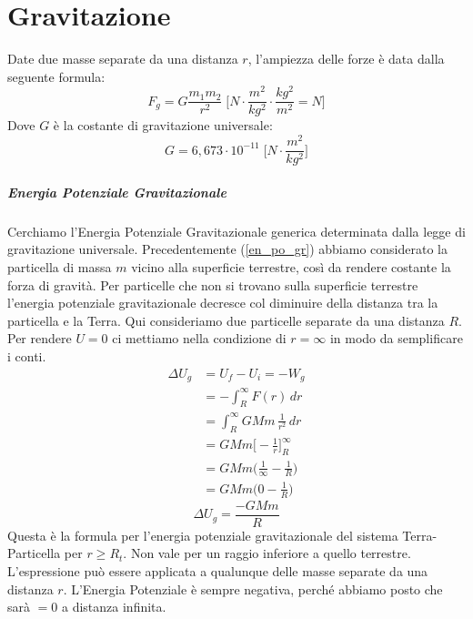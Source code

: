 \chapter{Gravitazione}

Date due masse separate da una distanza $r$, l'ampiezza delle forze è data 
dalla seguente formula:
\begin{equation}
    F_g = G\frac{m_1m_2}{r^2} \; 
    \Bigg[
        N \cdot  \frac{m^2}{kg^2} \cdot
        \frac{kg^2}{m^2} = N
    \Bigg]
\end{equation}
Dove $G$ è la costante di gravitazione universale:
\begin{equation*}
    G = 6,673 \cdot 10^{-11} \;\Bigg[N \cdot \frac{m^2}{kg^2}\Bigg]
\end{equation*}
    
    \paragraph{Energia Potenziale Gravitazionale} Cerchiamo l'Energia 
    Potenziale Gravitazionale generica determinata dalla legge di gravitazione 
    universale. Precedentemente (\ref{en_po_gr}) abbiamo considerato la 
    particella di massa $m$ vicino alla superficie terrestre, così da rendere 
    costante la forza di gravità. Per particelle che non si trovano sulla 
    superficie terrestre l'energia potenziale gravitazionale decresce col 
    diminuire della distanza tra la particella e la Terra. Qui consideriamo 
    due particelle separate da una distanza $R$. Per rendere $U = 0$ ci 
    mettiamo nella condizione di $ r = \infty$ in modo da semplificare i conti.
    \begin{align*}
        \Delta U_g &= U_f - U_i = -W_g \\
        &= - \int_{R}^{\infty} F(r) \,dr \\
        &= \int_{R}^{\infty} GMm \, \frac{1}{r^2} \,dr \\
        &= GMm \bigg[-\frac{1}{r}\bigg]^{\infty}_{R} \\
        &= GMm\biggl(\frac{1}{\infty} - \frac{1}{R}\biggr) \\
        &= GMm\biggl(0 - \frac{1}{R}\biggr)
    \end{align*}
    \begin{equation}
        \Delta U_g = \frac{-GMm}{R}
    \end{equation}
    Questa è la formula per l'energia potenziale gravitazionale del sistema
    Terra-Particella per $r \geq R_t$. Non vale per un raggio inferiore a
    quello terrestre.
    L'espressione può essere applicata a qualunque delle masse separate da una
    distanza $r$. L'Energia Potenziale è sempre negativa, perché abbiamo posto
    che sarà $= 0$ a distanza infinita.

